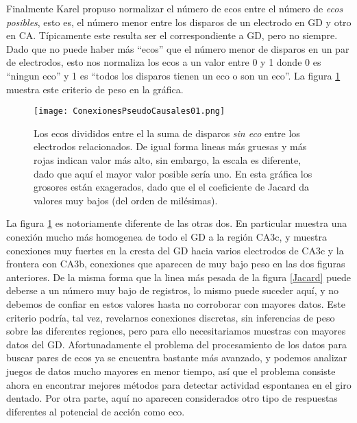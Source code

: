 \documentclass{article}
\begin{document}
Finalmente Karel propuso normalizar el número de ecos entre el número
de \emph{ecos posibles}, esto es, el número menor entre los disparos
de un electrodo en GD y otro en CA. Típicamente este resulta ser
el correspondiente a GD, pero no siempre. Dado que no puede haber más 
``ecos'' que el número menor de disparos en un par de electrodos, 
esto nos normaliza los ecos a un valor entre 0 y 1 donde 0 es
``ningun eco'' y 1 es ``todos los disparos tienen un eco o son un eco''.
La figura \ref{MinimalCrit} muestra este criterio de peso en la
gráfica.

\begin{figure}[h]
\centering
\texttt{[image: ConexionesPseudoCausales01.png]}
\caption{ Los ecos divididos entre el la suma de disparos
\emph{sin eco} entre los electrodos relacionados. De igual forma
lineas más gruesas y más rojas indican valor más alto, sin embargo,
la escala es diferente, dado que aquí el mayor valor posible sería uno.
En esta gráfica los grosores están exagerados, dado que el el 
coeficiente de Jacard da valores muy bajos (del orden de milésimas).
}\label{MinimalCrit}
\end{figure}

La figura \ref{MinimalCrit}
es notoriamente diferente de las otras dos. En particular
muestra una conexión mucho más homogenea de todo el GD a la 
región CA3c, y muestra conexiones muy fuertes en la cresta del GD 
hacia varios electrodos de CA3c y la frontera con CA3b, conexiones
que aparecen de muy bajo peso en las dos figuras anteriores.
De la misma forma que la linea más pesada de la figura \ref{Jacard}
puede deberse a un número muy bajo de registros, lo mismo puede
suceder aquí, y no debemos de confiar en estos valores hasta no 
corroborar con mayores datos. Este criterio podría, tal vez, 
revelarnos conexiones discretas, sin inferencias de peso sobre 
las diferentes regiones, pero para ello necesitariamos muestras
con mayores datos del GD. Afortunadamente el problema del procesamiento
de los datos para buscar pares de ecos ya se encuentra bastante 
más avanzado, y podemos analizar juegos de datos mucho mayores en menor
tiempo, así que el problema consiste ahora en encontrar mejores
métodos para detectar actividad espontanea en el giro dentado. Por
otra parte, aquí no aparecen considerados otro tipo de respuestas
diferentes al potencial de acción como eco. 
\end{document}

